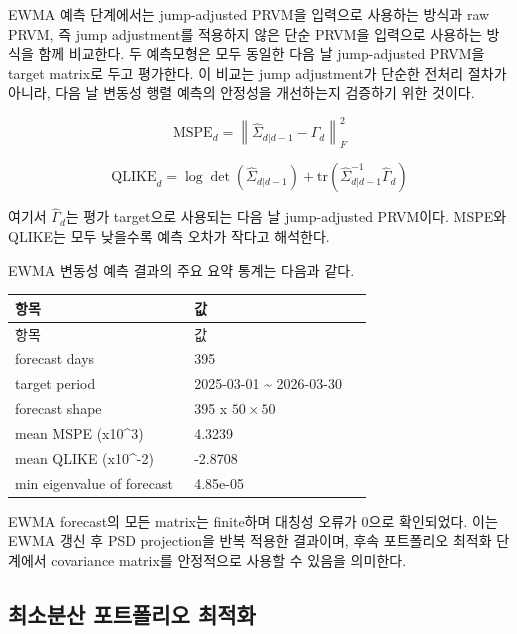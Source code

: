 \documentclass[12pt,a4paper]{article}
\begin{document}
EWMA 예측 단계에서는 jump-adjusted PRVM을 입력으로 사용하는 방식과 raw PRVM, 즉 jump adjustment를 적용하지 않은 단순 PRVM을 입력으로 사용하는 방식을 함께 비교한다. 두 예측모형은 모두 동일한 다음 날 jump-adjusted PRVM을 target matrix로 두고 평가한다. 이 비교는 jump adjustment가 단순한 전처리 절차가 아니라, 다음 날 변동성 행렬 예측의 안정성을 개선하는지 검증하기 위한 것이다.


\[
\text{MSPE}_d =
\left\|
\widehat{\Sigma}_{d|d-1} - \widehat{\Gamma}_d
\right\|_F^2
\]

\[
\text{QLIKE}_d =
\log\det(\widehat{\Sigma}_{d|d-1}) +
\mathrm{tr}
\left(
\widehat{\Sigma}_{d|d-1}^{-1}
\widehat{\Gamma}_d
\right)
\]

여기서 $\widehat{\Gamma}_d$는 평가 target으로 사용되는 다음 날 jump-adjusted PRVM이다. MSPE와 QLIKE는 모두 낮을수록 예측 오차가 작다고 해석한다.

EWMA 변동성 예측 결과의 주요 요약 통계는 다음과 같다.

\begin{center}
\small
\begin{longtable}{@{}p{0.48\linewidth}p{0.48\linewidth}@{}}
\toprule
항목 & 값 \\
\midrule
\endfirsthead
\toprule
항목 & 값 \\
\midrule
\endhead
forecast days & 395 \\
target period & 2025-03-01 \textasciitilde{} 2026-03-30 \\
forecast shape & 395 x $50 \times 50$ \\
mean MSPE (x10\textasciicircum{}3) & 4.3239 \\
mean QLIKE (x10\textasciicircum{}-2) & -2.8708 \\
min eigenvalue of forecast & 4.85e-05 \\
\bottomrule
\end{longtable}
\end{center}

EWMA forecast의 모든 matrix는 finite하며 대칭성 오류가 0으로 확인되었다. 이는 EWMA 갱신 후 PSD projection을 반복 적용한 결과이며, 후속 포트폴리오 최적화 단계에서 covariance matrix를 안정적으로 사용할 수 있음을 의미한다.


\subsection{최소분산 포트폴리오 최적화}
\end{document}
